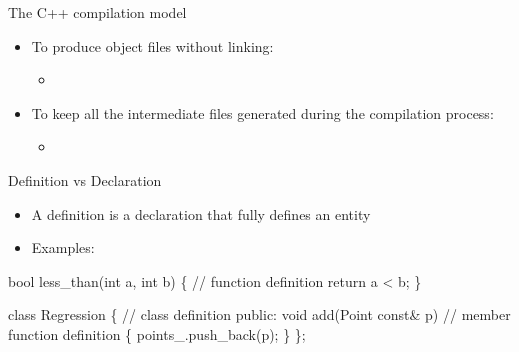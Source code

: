 \begin{frame}[fragile]{The C++ compilation model \insertcontinuationtext}
\begin{center}
    \end{center}

    \begin{itemize}
    \item<2-> To produce object files without linking:
      \begin{itemize}
      \item {}
      \end{itemize}
    \item<2-> To keep all the intermediate files generated during the compilation process:
      \begin{itemize}
      \item {}
      \end{itemize}
    \end{itemize}

\end{frame}

\begin{frame}[fragile]{Definition vs Declaration}

  \begin{itemize}
  \item A \alert{definition} is a declaration that fully defines an entity
  \item Examples:
  \end{itemize}

  \begin{codeblock}{
bool less_than(int a, int b) \{ // function definition
  return a < b;
\}

class Regression \{ // class definition
 \ddd
 public:
  void add(Point const& p) // member function definition
  \{ 
    points_.push_back(p); 
  \}
  \ddd
\};
}\end{codeblock}

\end{frame}

